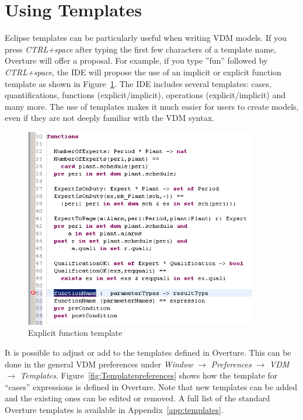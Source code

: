 \documentclass{overturerepchap}
\begin{document}
\section{Using Templates}\label{sec:templates}

Eclipse templates can be particularly useful when writing VDM models. If you
press \textit{CTRL+space} after typing the first few characters of a template name,
Overture will offer a proposal. For example, if you type ''fun'' followed
by \textit{CTRL+space}, the IDE will propose the use of an implicit or explicit
function template as shown in Figure~\ref{fig:functionTemplate}. The IDE includes
several templates: cases, quantifications, functions (explicit/implicit),
operations (explicit/implicit) and many more. The use of templates makes it much
easier for users to create models, even if they are not deeply familiar
with the VDM syntax.

\begin{figure}
\begin{center}
\includegraphics[width=4in]{figures/FunctionTemplate}
\caption{Explicit function template}
\label{fig:functionTemplate}
\end{center}
\end{figure}

It is possible to adjust or add to the templates defined in 
Overture. This can be done in the general VDM preferences under
\emph{Window} $\rightarrow$ \emph{Preferences} $\rightarrow$ \emph{VDM}
$\rightarrow$ \emph{Templates}. Figure~\ref{fig:Templatepreferences} shows
how the template for ``cases'' expressions is defined in Overture. Note
that new templates can be added and the existing ones can be
edited or removed. A full list of the
standard Overture templates is available in Appendix~\ref{app:templates}.
\end{document}
